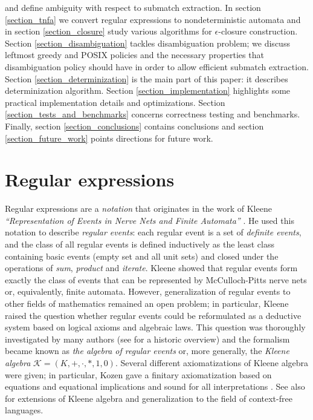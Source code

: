 \documentclass{article}
\newcommand{\Xeq}{\!=\!}
\theoremstyle{definition}
\begin{document}
\begin{multicols}{2}
and define ambiguity with respect to submatch extraction.
In section \ref{section_tnfa} we convert regular expressions to nondeterministic automata
and in section \ref{section_closure} study various algorithms for $\epsilon$-closure construction.
Section \ref{section_disambiguation} tackles disambiguation problem;
we discuss leftmost greedy and POSIX policies and the necessary properties that disambiguation policy should have in order to allow efficient submatch extraction.
Section \ref{section_determinization} is the main part of this paper: it describes determinization algorithm.
Section \ref{section_implementation} highlights some practical implementation details and optimizations.
Section \ref{section_tests_and_benchmarks} concerns correctness testing and benchmarks.
Finally, section \ref{section_conclusions} contains conclusions
and section \ref{section_future_work} points directions for future work.

\section{Regular expressions}\label{section_regular_expressions}

Regular expressions are a \emph{notation} that originates in the work of Kleene
\emph{``Representation of Events in Nerve Nets and Finite Automata''} \cite{Kle51} \cite{Kle56}.
He used this notation to describe \emph{regular events}:
each regular event is a set of \emph{definite events},
and the class of all regular events is defined inductively
as the least class containing basic events (empty set and all unit sets)
and closed under the operations of \emph{sum}, \emph{product} and \emph{iterate}.
Kleene showed that regular events form exactly the class of events that can be represented by McCulloch-Pitts nerve nets or, equivalently, finite automata.
However, generalization of regular events to other fields of mathematics remained an open problem;
in particular, Kleene raised the question whether regular events could be reformulated
as a deductive system based on logical axioms and algebraic laws.
This question was thoroughly investigated by many authors (see \cite{Koz94} for a historic overview)
and the formalism became known as \emph{the algebra of regular events} %
or, more generally, the \emph{Kleene algebra} $\mathcal{K} \Xeq (K, +, \cdot, *, 1, 0)$.
Several different axiomatizations of Kleene algebra were given;
in particular, Kozen gave a finitary axiomatization based on equations and equational implications and sound for all interpretations \cite{Koz94}.
See also \cite{Gra15} for extensions of Kleene algebra and generalization to the field of context-free languages.
\\


\end{multicols}
\end{document}
